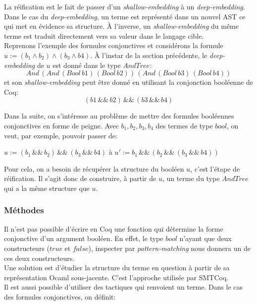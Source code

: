 \documentclass[11pt]{article}
\begin{document}
La réification est le fait de passer d'un \textit{shallow-embedding} à un \textit{deep-embedding}. Dans le cas du \textit{deep-embedding}, un terme est représenté dans un nouvel AST ce qui met en évidence sa structure. À l'inverse, un \textit{shallow-embedding} du même terme est traduit directement vers sa valeur dans le langage cible. \\

Reprenons l'exemple des formules conjonctives et considérons la formule $ u := (b_1 \wedge b_2) \wedge (b_3 \wedge b4)$. À l'instar de la section précédente, le \textit{deep-embedding} de $u$ est donné dans le type $AndTree$:
\[And\,(And\,(Bool\,b1)\,(Bool\,b2))\,(And\,(Bool\,b3)\,(Bool\,b4))\] 
et son \textit{shallow-embedding} peut être donné en utilisant la conjonction booléenne de Coq: 
\[(b1\,\&\&\,b2)\,\&\&\,(b3\,\&\&\,b4) \]

Dans la suite, on s'intéresse au problème de mettre des formules booléennes conjonctives en forme de peigne. Avec $b_1, b_2, b_3, b_4$ des termes de type $bool$, on veut, par exemple, pouvoir passer de: 
\begin{center}
$ u := (b_1 \,\&\&\, b_2) \,\&\&\, (b_3 \,\&\&\, b4)$ \hspace{1cm} à   \hspace{1cm}  $u' := b_1 \,\&\&\, (b_2 \,\&\&\, (b_3 \,\&\&\, b4)) $
\end{center}

Pour cela, on a besoin de récupérer la structure du booléen $u$, c'est l'étape de réification. Il s'agit donc de construire, à partir de $u$, un terme du type $AndTree$ qui a la même structure que $u$.

\subsubsection{Méthodes}

Il n'est pas possible d'écrire en Coq une fonction qui détermine la forme conjonctive d'un argument booléen. En effet, le type $bool$ n'ayant que deux constructeurs ($true$ et $false$), inspecter par \textit{pattern-matching} nous donnera un de ces deux constructeurs.\\

Une solution est d'étudier la structure du terme en question à partir de sa représentation Ocaml sous-jacente. C'est l'approche utilisée par SMTCoq. \\

Il est aussi possible d'utiliser des tactiques qui renvoient un terme. Dans le cas des formules conjonctives, on définit:
\end{document}

